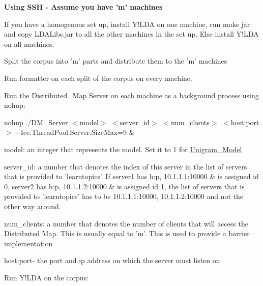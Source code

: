 \begin{DoxyEnumerate}
\item 

{\bfseries Using SSH -\/ Assume you have 'm' machines} 
\begin{DoxyEnumerate}
\item 

If you have a homogenous set up, install Y!LDA on one machine, run make jar and copy LDALibs.jar to all the other machines in the set up. Else install Y!LDA on all machines. 
\item 

Split the corpus into 'm' parts and distribute them to the 'm' machines 
\item 

Run formatter on each split of the corpus on every machine. 
\item 

Run the Distributed\_\-Map Server on each machine as a background process using nohup: 

{\ttfamily nohup ./DM\_\-Server $<$model$>$ $<$server\_\-id$>$ $<$num\_\-clients$>$ $<$host:port$>$ -\/-\/Ice.ThreadPool.Server.SizeMax=9 \&} 
\begin{DoxyEnumerate}
\item 

model: an integer that represents the model. Set it to 1 for \hyperlink{class_unigram___model}{Unigram\_\-Model} 
\item 

server\_\-id: a number that denotes the index of this server in the list of servers that is provided to 'learntopics'. If server1 has h:p, 10.1.1.1:10000 \& is assigned id 0, server2 has h:p, 10.1.1.2:10000 \& is assigned id 1, the list of servers that is provided to 'learntopics' has to be 10.1.1.1:10000, 10.1.1.2:10000 and not the other way around. 
\item 

num\_\-clients: a number that denotes the number of clients that will access the Distributed Map. This is usually equal to 'm'. This is used to provide a barrier implementation 
\item 

host:port-\/ the port and ip address on which the server must listen on 
\end{DoxyEnumerate}
\item 

Run Y!LDA on the corpus: 
\begin{DoxyEnumerate}
\item 


\end{DoxyEnumerate}
\end{DoxyEnumerate}
\end{DoxyEnumerate}
